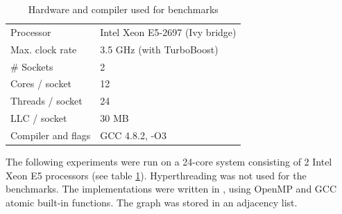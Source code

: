   \begin{table}[h]
    \centering
    \begin{tabular}{ll}
    \toprule
    Processor        & Intel Xeon E5-2697 (Ivy bridge) \\
    Max. clock rate  & 3.5 GHz (with TurboBoost)\\
    \# Sockets       & 2 \\
    Cores / socket   & 12 \\
    Threads / socket & 24 \\
    LLC / socket     & 30 MB \\
    \midrule
    Compiler and flags & GCC 4.8.2, -O3\\
    \bottomrule
    \end{tabular}
    \caption{Hardware and compiler used for benchmarks}
    \label{tab:hardware}
  \end{table}
 
The following experiments were run on a 24-core system consisting of 2 Intel Xeon E5 processors (see table \ref{tab:hardware}).
Hyperthreading was not used for the benchmarks.
The implementations were written in \Cpp, using OpenMP and GCC atomic built-in functions. The graph was stored in an adjacency list.


